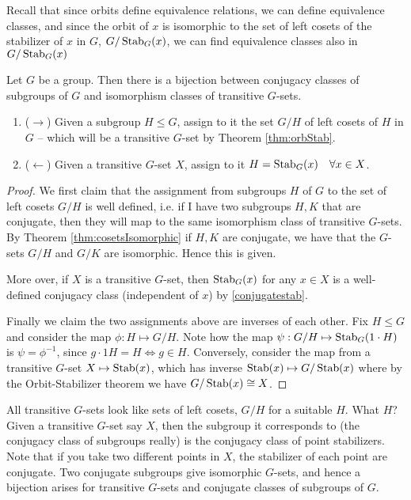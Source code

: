 Recall that since orbits define equivalence relations, we can define equivalence classes,
and since the orbit of $x$ is isomorphic to the set of left cosets of the stabilizer of
$x$ in $G$, $G/\operatorname*{Stab}_G(x)$, we can find equivalence classes also in $G/\operatorname*{Stab}_G(x)$
\begin{theorem}
  Let $G$ be a group. Then there is a bijection between conjugacy classes of subgroups of
  $G$ and isomorphism classes of transitive $G$-sets.
  \begin{enumerate}
    \item ($\rightarrow$) Given a subgroup $H\leq G$, assign to it the set $G/H$ of left
      cosets of $H$ in $G$ -- which will be a transitive $G$-set by Theorem \ref{thm:orbStab}.
    \item ($\leftarrow$) Given a transitive $G$-set $X$, assign to it $H=\operatorname*{Stab}_G(x) \quad \forall
      x\in X$.
  \end{enumerate}
  \label{<+label+>}
\end{theorem}
\begin{proof}
  We first claim that the assignment from subgroups $H$ of $G$ to the set of left cosets
  $G/H$ is well defined, i.e. if I have two subgroups $H,K$ that are conjugate, then they
  will map to the same isomorphism class of transitive $G$-sets. By Theorem \ref{thm:cosetsIsomorphic} if $H,K$
  are conjugate, we have that the $G$-sets $G/H$ and $G/K$ are isomorphic. Hence this is
  given.

  More over, if $X$ is a transitive $G$-set, then $\operatorname*{Stab}_G(x)$ for any $x\in X$ is a
  well-defined conjugacy class (independent of $x$) by \ref{conjugatestab}.
   
  Finally we claim the two assignments above are inverses of each other. Fix $H\leq
  G$ and consider the map $\phi:H\mapsto G/H$. Note how the map
  $\psi:G/H\mapsto\operatorname*{Stab}_G(1\cdot H)$ is $\psi=\phi^{-1}$, since $g\cdot 1H=H \iff g\in H$.
  Conversely, consider the map from a transitive $G$-set $X\mapsto \operatorname*{Stab}(x)$, which has
  inverse $\operatorname*{Stab}(x)\mapsto G/\operatorname*{Stab}(x)$ where by the Orbit-Stabilizer theorem we have
  $G/\operatorname*{Stab}(x)\cong X$.
\end{proof}
All transitive $G$-sets look like sets of left cosets, $G/H$ for a suitable $H$. What $H$?
Given a transitive $G$-set say $X$, then the subgroup it corresponds to (the conjugacy
class of subgroups really) is the conjugacy class of point stabilizers.
Note that if you take two different points in $X$, the stabilizer of each point are
conjugate. Two conjugate subgroups give isomorphic $G$-sets, and hence a bijection arises for
transitive $G$-sets and conjugate classes of subgroups of $G$.
